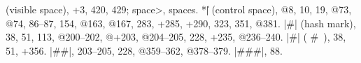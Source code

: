 \def\readnumi{\digitother\afterassignment\makelink\mycnt=\myi}
\def\readnumii{\digitother\afterassignment\makelink\mycnt=\myii}
\def\readnumiii{\digitother\afterassignment\makelink\mycnt=\myiii}
\def\readnumiv{\digitother\afterassignment\makelink\mycnt=\myiv}
\def\readnumv{\digitother\afterassignment\makelink\mycnt=\myv}
\def\readnumvi{\digitother\afterassignment\makelink\mycnt=\myvi}
\def\readnumvii{\digitother\afterassignment\makelink\mycnt=\myvii}
\def\readnumviii{\digitother\afterassignment\makelink\mycnt=\myviii}
\def\readnumix{\digitother\afterassignment\makelink\mycnt=\myix}
\def\makelink{\pdflinkx{page\the\mycnt}{\the\mycnt}\digitactive}
\makexeCJKinactive
\] (visible space), +3, 420, 429; \also \<space>, spaces.
*|\|\] (control space), @8, 10, 19, @73, @74, 86--87, 154, @163, @167, 283,
  +285, +290, 323, 351, @381.
|#| (hash mark), 38, 51, 113, @200--202, @+203, @204--205, 228, +235, @236--240.
|\#| ( \#\ ), 38, 51, +356.
|##|, 203--205, 228, @359--362, @378--379.
|###|, 88.
